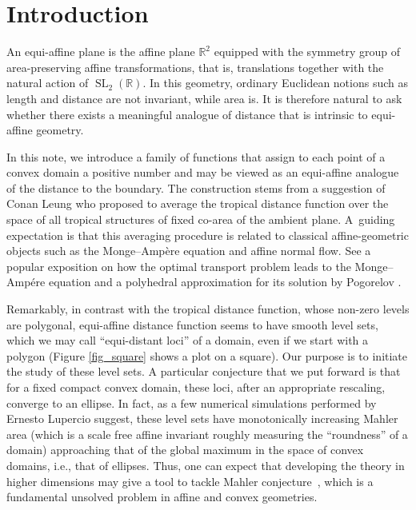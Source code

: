 \documentclass[pdftex]{sigma}
\numberwithin{equation}{section}
\theoremstyle{definition}
\begin{document}
\section{Introduction}

An equi-affine plane is the affine plane $\mathbb{R}^2$ equipped with the symmetry group of area-preserving affine transformations, that is, translations together with the natural action of $\operatorname{SL}_2(\mathbb{R})$. In this geometry, ordinary Euclidean notions such as length and distance are not invariant, while area is. It is therefore natural to ask whether there exists a meaningful analogue of distance that is intrinsic to equi-affine geometry.

In this note, we introduce a family of functions that assign to each point of a convex domain a positive number and may be viewed as an equi-affine analogue of the distance to the boundary. The construction stems from a suggestion of Conan Leung who proposed to average the tropical distance function over the space of all tropical structures of fixed co-area of the ambient plane. A~guiding expectation is that this averaging procedure is related to classical affine-geometric objects such as the Monge--Amp\`ere equation and affine normal flow. See a popular exposition on how the optimal transport problem leads to the Monge--Amp\'ere equation \cite{caffarelli2004monge} and a polyhedral approximation for its solution by Pogorelov \cite{gutierrez2016monge, pogorelov1964monge,pogorelov1971regularity, pogorelov1975minkowski,1988}.

Remarkably, in contrast with the tropical distance function, whose non-zero levels are polygonal, equi-affine distance function seems to have smooth level sets, which we may call ``equi-distant loci'' of a domain, even if we start with a polygon (Figure \ref{fig_square} shows a plot on a square). Our purpose is to initiate the study of these level sets. A particular conjecture that we put forward is that for a fixed compact convex domain, these loci, after an appropriate rescaling, converge to an ellipse. In fact, as a few numerical simulations performed by Ernesto Lupercio suggest, these level sets have monotonically increasing Mahler area (which is a scale free affine invariant roughly measuring the ``roundness'' of a domain) approaching that of the global maximum in the space of convex domains, i.e., that of ellipses. Thus, one can expect that developing the theory in higher dimensions may give a tool to tackle Mahler conjecture~\cite{mahler}, which is a fundamental unsolved problem in affine and convex geometries.
\end{document}
